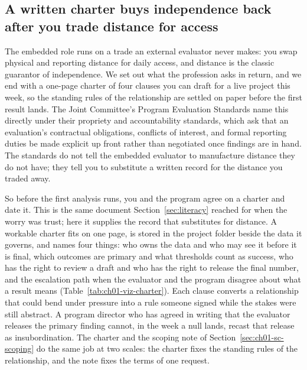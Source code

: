 \subsection{A written charter buys independence back after you trade distance for access}\label{sec:ch01-charter}
The embedded role runs on a trade an external evaluator never makes: you swap physical and reporting distance for daily access, and distance is the classic guarantor of independence. We set out what the profession asks in return, and we end with a one-page charter of four clauses you can draft for a live project this week, so the standing rules of the relationship are settled on paper before the first result lands. The Joint Committee's Program Evaluation Standards \parencite{yarbrough2011standards} name this directly under their propriety and accountability standards, which ask that an evaluation's contractual obligations, conflicts of interest, and formal reporting duties be made explicit up front rather than negotiated once findings are in hand. The standards do not tell the embedded evaluator to manufacture distance they do not have; they tell you to substitute a written record for the distance you traded away.

So before the first analysis runs, you and the program agree on a charter and date it. This is the same document Section~\ref{sec:literacy} reached for when the worry was trust; here it supplies the record that substitutes for distance. A workable charter fits on one page, is stored in the project folder beside the data it governs, and names four things: who owns the data and who may see it before it is final, which outcomes are primary and what thresholds count as success, who has the right to review a draft and who has the right to release the final number, and the escalation path when the evaluator and the program disagree about what a result means (Table~\ref{tab:ch01-viz-charter}). Each clause converts a relationship that could bend under pressure into a rule someone signed while the stakes were still abstract. A program director who has agreed in writing that the evaluator releases the primary finding cannot, in the week a null lands, recast that release as insubordination. The charter and the scoping note of Section~\ref{sec:ch01-sc-scoping} do the same job at two scales: the charter fixes the standing rules of the relationship, and the note fixes the terms of one request.

